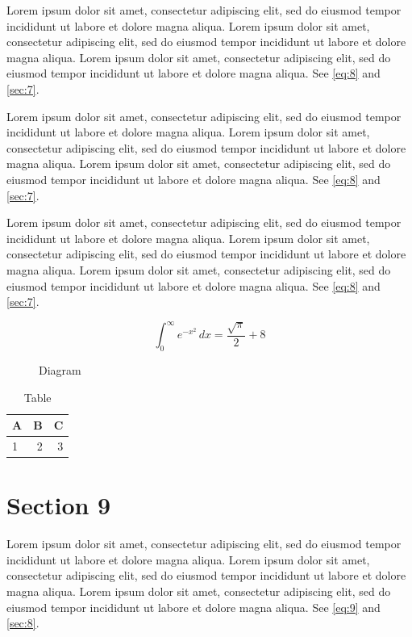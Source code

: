 \documentclass[11pt]{article}
\begin{document}
Lorem ipsum dolor sit amet, consectetur adipiscing elit, sed do eiusmod tempor incididunt ut labore et dolore magna aliqua. Lorem ipsum dolor sit amet, consectetur adipiscing elit, sed do eiusmod tempor incididunt ut labore et dolore magna aliqua. Lorem ipsum dolor sit amet, consectetur adipiscing elit, sed do eiusmod tempor incididunt ut labore et dolore magna aliqua. See \cref{eq:8} and \cref{sec:7}.

Lorem ipsum dolor sit amet, consectetur adipiscing elit, sed do eiusmod tempor incididunt ut labore et dolore magna aliqua. Lorem ipsum dolor sit amet, consectetur adipiscing elit, sed do eiusmod tempor incididunt ut labore et dolore magna aliqua. Lorem ipsum dolor sit amet, consectetur adipiscing elit, sed do eiusmod tempor incididunt ut labore et dolore magna aliqua. See \cref{eq:8} and \cref{sec:7}.

Lorem ipsum dolor sit amet, consectetur adipiscing elit, sed do eiusmod tempor incididunt ut labore et dolore magna aliqua. Lorem ipsum dolor sit amet, consectetur adipiscing elit, sed do eiusmod tempor incididunt ut labore et dolore magna aliqua. Lorem ipsum dolor sit amet, consectetur adipiscing elit, sed do eiusmod tempor incididunt ut labore et dolore magna aliqua. See \cref{eq:8} and \cref{sec:7}.

\begin{equation}\label{eq:8} \int_0^\infty e^{-x^2}\,dx = \frac{\sqrt{\pi}}{2} + 8\end{equation}
\begin{figure}[h]\centering{}\caption{Diagram}\end{figure}
\begin{table}[h]\centering\begin{tabular}{lrr}\toprule A&B&C\\\midrule 1&2&3\\\bottomrule\end{tabular}\caption{Table}\end{table}
\section{Section 9}\label{sec:9}
Lorem ipsum dolor sit amet, consectetur adipiscing elit, sed do eiusmod tempor incididunt ut labore et dolore magna aliqua. Lorem ipsum dolor sit amet, consectetur adipiscing elit, sed do eiusmod tempor incididunt ut labore et dolore magna aliqua. Lorem ipsum dolor sit amet, consectetur adipiscing elit, sed do eiusmod tempor incididunt ut labore et dolore magna aliqua. See \cref{eq:9} and \cref{sec:8}.
\end{document}
